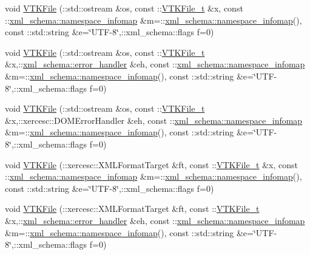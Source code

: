 \begin{DoxyCompactItemize}
\item 
void \hyperlink{vtk-unstructured_8h_ac90f18d155cf97a104dbaa3d35a9deb8}{V\+T\+K\+File} (\+::std\+::ostream \&os, const \+::\hyperlink{classVTKFile__t}{V\+T\+K\+File\+\_\+t} \&x, const \+::\hyperlink{namespacexml__schema_a17712c8260e03226f0a9e4d21ab78f42}{xml\+\_\+schema\+::namespace\+\_\+infomap} \&m=\+::\hyperlink{namespacexml__schema_a17712c8260e03226f0a9e4d21ab78f42}{xml\+\_\+schema\+::namespace\+\_\+infomap}(), const \+::std\+::string \&e=\char`\"{}U\+TF-\/8\char`\"{},\+::xml\+\_\+schema\+::flags f=0)
\item 
void \hyperlink{vtk-unstructured_8h_abcc755db539e4a67f8b049fc2e7dd553}{V\+T\+K\+File} (\+::std\+::ostream \&os, const \+::\hyperlink{classVTKFile__t}{V\+T\+K\+File\+\_\+t} \&x,\+::\hyperlink{namespacexml__schema_a0a5d9528e9175cedf199984a8bb64d62}{xml\+\_\+schema\+::error\+\_\+handler} \&eh, const \+::\hyperlink{namespacexml__schema_a17712c8260e03226f0a9e4d21ab78f42}{xml\+\_\+schema\+::namespace\+\_\+infomap} \&m=\+::\hyperlink{namespacexml__schema_a17712c8260e03226f0a9e4d21ab78f42}{xml\+\_\+schema\+::namespace\+\_\+infomap}(), const \+::std\+::string \&e=\char`\"{}U\+TF-\/8\char`\"{},\+::xml\+\_\+schema\+::flags f=0)
\item 
void \hyperlink{vtk-unstructured_8h_af502d85cce2ef4abe04e726753740f80}{V\+T\+K\+File} (\+::std\+::ostream \&os, const \+::\hyperlink{classVTKFile__t}{V\+T\+K\+File\+\_\+t} \&x,\+::xercesc\+::\+D\+O\+M\+Error\+Handler \&eh, const \+::\hyperlink{namespacexml__schema_a17712c8260e03226f0a9e4d21ab78f42}{xml\+\_\+schema\+::namespace\+\_\+infomap} \&m=\+::\hyperlink{namespacexml__schema_a17712c8260e03226f0a9e4d21ab78f42}{xml\+\_\+schema\+::namespace\+\_\+infomap}(), const \+::std\+::string \&e=\char`\"{}U\+TF-\/8\char`\"{},\+::xml\+\_\+schema\+::flags f=0)
\item 
void \hyperlink{vtk-unstructured_8h_aa50999f203f54769dfc839c818f24588}{V\+T\+K\+File} (\+::xercesc\+::\+X\+M\+L\+Format\+Target \&ft, const \+::\hyperlink{classVTKFile__t}{V\+T\+K\+File\+\_\+t} \&x, const \+::\hyperlink{namespacexml__schema_a17712c8260e03226f0a9e4d21ab78f42}{xml\+\_\+schema\+::namespace\+\_\+infomap} \&m=\+::\hyperlink{namespacexml__schema_a17712c8260e03226f0a9e4d21ab78f42}{xml\+\_\+schema\+::namespace\+\_\+infomap}(), const \+::std\+::string \&e=\char`\"{}U\+TF-\/8\char`\"{},\+::xml\+\_\+schema\+::flags f=0)
\item 
void \hyperlink{vtk-unstructured_8h_aa6813b97cd4aaadfcd013597e2cd2f82}{V\+T\+K\+File} (\+::xercesc\+::\+X\+M\+L\+Format\+Target \&ft, const \+::\hyperlink{classVTKFile__t}{V\+T\+K\+File\+\_\+t} \&x,\+::\hyperlink{namespacexml__schema_a0a5d9528e9175cedf199984a8bb64d62}{xml\+\_\+schema\+::error\+\_\+handler} \&eh, const \+::\hyperlink{namespacexml__schema_a17712c8260e03226f0a9e4d21ab78f42}{xml\+\_\+schema\+::namespace\+\_\+infomap} \&m=\+::\hyperlink{namespacexml__schema_a17712c8260e03226f0a9e4d21ab78f42}{xml\+\_\+schema\+::namespace\+\_\+infomap}(), const \+::std\+::string \&e=\char`\"{}U\+TF-\/8\char`\"{},\+::xml\+\_\+schema\+::flags f=0)

\end{DoxyCompactItemize}
